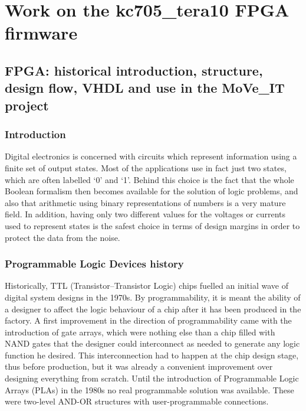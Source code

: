 \part{Work on the kc705\_tera10 FPGA firmware}

\chapter{FPGA: historical introduction, structure, design flow, VHDL and use in the MoVe\_IT project}
\section{Introduction}
\noindent Digital electronics is concerned with circuits which represent information using a finite set of output
states. Most of the applications use in fact just two states, which are often labelled ‘0’ and ‘1’.
Behind this choice is the fact that the whole Boolean formalism then becomes available for the
solution of logic problems, and also that arithmetic using binary representations of numbers is a very
mature field\cite{fpga1}.
\newline
In addition, having only two
different values for the voltages or currents used to represent states is the safest choice in terms of
design margins in order to protect the data from the noise.



\section{Programmable Logic Devices history}
\noindent Historically, TTL (Transistor–Transistor Logic) chips fuelled an initial wave of digital system designs in
the 1970s.
By programmability, it is meant the ability of a
designer to affect the logic behaviour of a chip after it has been produced in the factory.
\newline
\noindent A first improvement in the direction of programmability came with the introduction of gate
arrays, which were nothing else than a chip filled with NAND gates that the designer could
interconnect as needed to generate any logic function he desired.
This interconnection had to happen
at the chip design stage, thus before production, but it was already a convenient improvement over
designing everything from scratch. Until the introduction of Programmable Logic
Arrays (PLAs) in the 1980s no real programmable solution was available. These were two-level AND-OR
structures with user-programmable connections.

